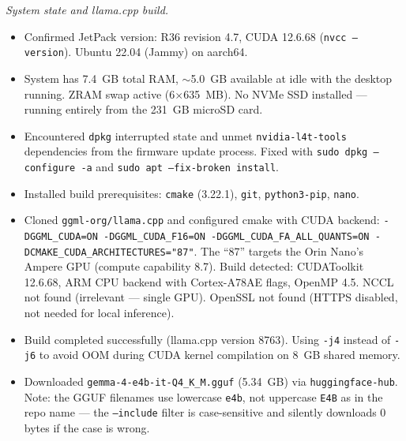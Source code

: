 \documentclass{article}
\theoremstyle{plain}
\theoremstyle{definition}
\theoremstyle{remark}
\begin{document}
\textit{System state and llama.cpp build.}
\begin{itemize}
\item Confirmed JetPack version: R36 revision 4.7, CUDA 12.6.68 (\texttt{nvcc --version}). Ubuntu 22.04 (Jammy) on aarch64.
\item System has 7.4~GB total RAM, $\sim$5.0~GB available at idle with the desktop running. ZRAM swap active (6$\times$635~MB). No NVMe SSD installed --- running entirely from the 231~GB microSD card.
\item Encountered \texttt{dpkg} interrupted state and unmet \texttt{nvidia-l4t-tools} dependencies from the firmware update process. Fixed with \texttt{sudo dpkg --configure -a} and \texttt{sudo apt --fix-broken install}.
\item Installed build prerequisites: \texttt{cmake} (3.22.1), \texttt{git}, \texttt{python3-pip}, \texttt{nano}.
\item Cloned \texttt{ggml-org/llama.cpp} and configured cmake with CUDA backend: \texttt{-DGGML\_CUDA=ON -DGGML\_CUDA\_F16=ON -DGGML\_CUDA\_FA\_ALL\_QUANTS=ON -DCMAKE\_CUDA\_ARCHITECTURES="87"}. The ``87'' targets the Orin Nano's Ampere GPU (compute capability 8.7). Build detected: CUDAToolkit 12.6.68, ARM CPU backend with Cortex-A78AE flags, OpenMP 4.5. NCCL not found (irrelevant --- single GPU). OpenSSL not found (HTTPS disabled, not needed for local inference).
\item Build completed successfully (llama.cpp version 8763). Using \texttt{-j4} instead of \texttt{-j6} to avoid OOM during CUDA kernel compilation on 8~GB shared memory.
\item Downloaded \texttt{gemma-4-e4b-it-Q4\_K\_M.gguf} (5.34~GB) via \texttt{huggingface-hub}. Note: the GGUF filenames use lowercase \texttt{e4b}, not uppercase \texttt{E4B} as in the repo name --- the \texttt{--include} filter is case-sensitive and silently downloads 0 bytes if the case is wrong.
\end{itemize}
\end{document}
